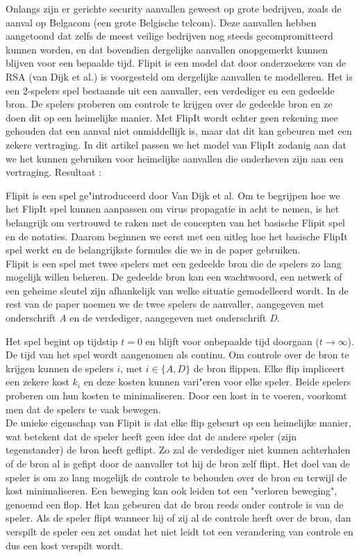 \documentclass[master=cws, masteroption=vs]{kulemt}
\begin{document}
\begin{abstract*}
Onlangs zijn er gerichte security aanvallen geweest op grote bedrijven, zoals de aanval op Belgacom (een grote Belgische telcom). Deze aanvallen hebben aangetoond dat zelfs de meest veilige
bedrijven nog steeds gecompromitteerd kunnen worden, en dat bovendien dergelijke aanvallen onopgemerkt kunnen blijven voor een bepaalde tijd.
Flipit is een model dat door onderzoekers van de RSA (van Dijk et al.) is voorgesteld om dergelijke aanvallen te modelleren. Het is een 2-spelers spel bestaande uit een aanvaller, een verdediger en een gedeelde bron.  De spelers proberen om controle te krijgen over de gedeelde bron en ze
doen dit op een heimelijke manier. Met FlipIt wordt echter geen rekening mee gehouden dat een aanval niet onmiddellijk is, maar dat dit kan gebeuren met een zekere vertraging. In dit artikel passen we het model van FlipIt zodanig aan dat we het kunnen gebruiken voor heimelijke aanvallen die onderheven zijn aan een vertraging.
Resultaat :

Flipit is een spel ge"introduceerd door Van Dijk et al. Om te begrijpen hoe we het FlipIt spel kunnen aanpassen om virus propagatie in acht te nemen, is het belangrijk om vertrouwd te raken met de concepten van het basische Flipit spel en de notaties. Daarom beginnen we eerst met een uitleg hoe het basische FlipIt spel werkt en de belangrijkste formules die we in de paper gebruiken. \\

Flipit is een spel met twee spelers met een gedeelde bron die de spelers zo lang mogelijk willen beheren. De gedeelde bron kan een wachtwoord, een netwerk of een geheime sleutel zijn afhankelijk van welke situatie gemodelleerd wordt. In de rest van de paper noemen we de twee spelers de aanvaller, aangegeven met onderschrift  \textit{A} en de verdediger, aangegeven met onderschrift \textit{D}.

Het spel begint op tijdstip $ t = 0 $ en blijft voor onbepaalde tijd doorgaan ($ t \rightarrow \infty $). De tijd van het spel wordt aangenomen als continu. Om controle over de bron te krijgen kunnen de spelers $i$, met $ i \in \{A, D \} $ de bron flippen. Elke flip impliceert een zekere kost $ k_{i} $ en deze kosten kunnen vari"eren voor elke speler. Beide spelers proberen om hun kosten te minimaliseren. Door een kost in te voeren, voorkomt men dat de spelers te vaak bewegen. \\

De unieke eigenschap van Flipit is dat elke flip gebeurt op een heimelijke manier, wat betekent dat de speler heeft geen idee dat de andere speler (zijn tegenstander) de bron heeft geflipt. Zo zal de verdediger niet kunnen achterhalen of de bron al is gefipt door de aanvaller tot hij de bron zelf flipt. Het doel van de speler is om zo lang mogelijk de controle te behouden over de bron en terwijl de kost minimaliseren. Een beweging kan ook leiden tot een "verloren beweging", genoemd een flop. Het kan gebeuren dat de bron reeds onder controle is van de speler. Als de speler flipt wanneer hij of zij al de controle  heeft over de bron, dan verspilt de speler een zet omdat het niet leidt tot een verandering van controle en dus een kost verspilt wordt. \\



\end{abstract*}
\end{document}
